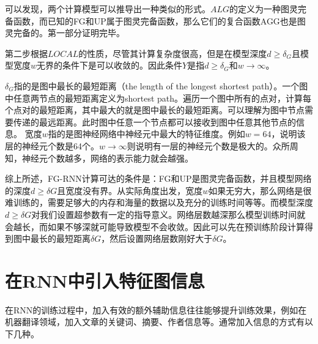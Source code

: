 可以发现，两个计算模型可以推导出一种类似的形式。$ALG$的定义为一种图灵完备函数，而已知的FG和UP属于图灵完备函数，那么它们的复合函数AGG也是图灵完备的。第一部分证明完毕。

第二步根据$LOCAL$的性质，尽管其计算复杂度很高，但是在模型深度$d\geq \delta_G$且模型宽度$w$无界的条件下是可以收敛的。因此条件$Y$是指$d\geq \delta_G$和$w \rightarrow \infty$。

$\delta_G$指的是图中最长的最短距离（the length of the longest shortest path）。一个图中任意两节点的最短距离定义为shortest path。遍历一个图中所有的点对，计算每个点对的最短距离，其中最大的就是图中最长的最短距离。可以理解为图中节点需要传递的最远距离。此时图中任意一个节点都可以接收到图中任意其他节点的信息。 宽度$w$指的是图神经网络中神经元中最大的特征维度。例如$w=64$，说明该层的神经元个数是64个。$w \rightarrow \infty$则说明有一层的神经元个数是极大的。众所周知，神经元个数越多，网络的表示能力就会越强。
 
 
 综上所述，FG-RNN计算可达的条件是：FG和UP是图灵完备函数，并且模型网络的深度$d\geq \delta G$且宽度没有界。​从实际角度出发，宽度$w$如果无穷大，那么网络是很难训练的，需要足够大的内存和海量的数据以及充分的训练时间等等。而模型深度$d\geq \delta G$对我们设置超参数有一定的指导意义。网络层数越深那么模型训练时间就会越长，而如果不够深就可能导致模型不会收敛。因此可以先在预训练阶段计算得到图中最长的最短距离$\delta G$，然后设置网络层数刚好大于$\delta G$。
 
 


\section{在RNN中引入特征图信息}
在RNN的训练过程中，加入有效的额外辅助信息往往能够提升训练效果，例如在机器翻译领域，加入文章的关键词、摘要、作者信息等。通常加入信息的方式有以下几种。

